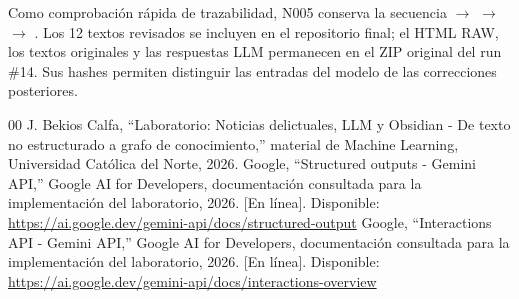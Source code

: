 \documentclass[conference]{IEEEtran}
\begin{document}
Como comprobación rápida de trazabilidad, N005 conserva la secuencia  $\rightarrow$  $\rightarrow$  $\rightarrow$ . Los 12 textos revisados se incluyen en el repositorio final; el HTML RAW, los textos originales y las respuestas LLM permanecen en el ZIP original del run \#14. Sus hashes permiten distinguir las entradas del modelo de las correcciones posteriores.

\begin{thebibliography}{00}
 J. Bekios Calfa, ``Laboratorio: Noticias delictuales, LLM y Obsidian - De texto no estructurado a grafo de conocimiento,'' material de Machine Learning, Universidad Católica del Norte, 2026.
 Google, ``Structured outputs - Gemini API,'' Google AI for Developers, documentación consultada para la implementación del laboratorio, 2026. [En línea]. Disponible: \url{https://ai.google.dev/gemini-api/docs/structured-output}
 Google, ``Interactions API - Gemini API,'' Google AI for Developers, documentación consultada para la implementación del laboratorio, 2026. [En línea]. Disponible: \url{https://ai.google.dev/gemini-api/docs/interactions-overview}
\end{thebibliography}
\end{document}

